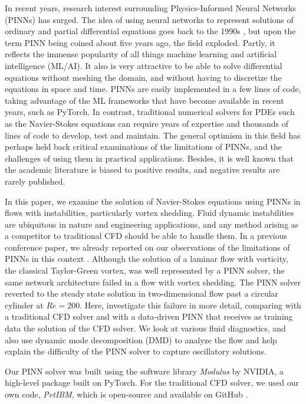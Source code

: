 
In recent years, research interest surrounding Physics-Informed Neural Networks (PINNs) has surged.
The idea of using neural networks to represent solutions of ordinary and partial differential equations goes back to the 1990s \cite{dissanayake_neural-network-based_1994,lagaris_artificial_1998}, but upon the term PINN being coined about five years ago, the field exploded. 
Partly, it reflects the immense popularity of all things machine learning and artificial intelligence (ML/AI). 
It also is very attractive to be able to solve differential equations without meshing the domain, and without having to discretize the equations in space and time. 
PINNs are easily implemented in a few lines of code, taking advantage of the ML frameworks that have become available in recent years, such as PyTorch. 
In contrast, traditional numerical solvers for PDEs such as the Navier-Stokes equations can require years of expertise and thousands of lines of code to develop, test and maintain. 
The general optimism in this field has perhaps held back critical examinations of the limitations of PINNs, and the challenges of using them in practical applications. 
Besides, it is well known that the academic literature is biased to positive results, and negative results are rarely published. 

In this paper, we examine the solution of Navier-Stokes equations using PINNs in flows with instabilities, particularly vortex shedding. 
Fluid dynamic instabilities are ubiquitous in nature and engineering applications, and any method arising as a competitor to traditional CFD should be able to handle them. 
In a previous conference paper, we already reported on our observations of the limitations of PINNs in this context \cite{chuang_predicting_2020}. 
Although the solution of a laminar flow with vorticity, the classical Taylor-Green vortex, was well represented by a PINN solver, the same network architecture failed in a flow with vortex shedding. 
The PINN solver reverted to the steady state solution in two-dimensional flow past a circular cylinder at $Re=200$. 
Here, investigate this failure in more detail, comparing with a traditional CFD solver and with a data-driven PINN that receives as training data the solution of the CFD solver. 
We look at various fluid diagnostics, and also use dynamic mode decomposition (DMD) to analyze the flow and help explain the difficulty of the PINN solver to capture oscillatory solutions.

Our PINN solver was built using the software library \emph{Modulus} by NVIDIA, a high-level package built on PyTorch.
For the traditional CFD solver, we used our own code, \emph{PetIBM}, which is open-source and available on GitHub \cite{chuang_petibm_2018}.